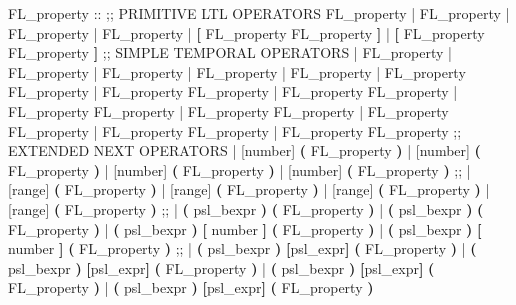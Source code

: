 \begin{Grammar}
FL_property ::
 ;; PRIMITIVE LTL OPERATORS
    FL_property                      
 |  FL_property                     
 |  FL_property                      
 |  FL_property                      
 | \textbf{[} FL_property  FL_property \textbf{]}  
 | \textbf{[} FL_property  FL_property \textbf{]}  
 ;; SIMPLE TEMPORAL OPERATORS
 |  FL_property                 
 |  FL_property                  
 |  FL_property                   
 |  FL_property                  
 |  FL_property            
 | FL_property  FL_property     
 | FL_property  FL_property      
 | FL_property  FL_property                                     
 | FL_property  FL_property     
 | FL_property  FL_property    
 | FL_property  FL_property     
 | FL_property  FL_property   
 | FL_property  FL_property    
 ;; EXTENDED NEXT OPERATORS
 |  [number] \textbf{(} FL_property \textbf{)}
 |  [number] \textbf{(} FL_property \textbf{)}                     
 |  [number] \textbf{(} FL_property \textbf{)}                   
 |  [number] \textbf{(} FL_property \textbf{)}                  
 ;;
 |  [range] \textbf{(} FL_property \textbf{)}
 |  [range] \textbf{(} FL_property \textbf{)}
 |  [range] \textbf{(} FL_property \textbf{)}
 |  [range] \textbf{(} FL_property \textbf{)}
 ;;
 |  \textbf{(} psl_bexpr \textbf{)} \textbf{(} FL_property \textbf{)}
 |  \textbf{(} psl_bexpr \textbf{)} \textbf{(} FL_property \textbf{)}
 |  \textbf{(} psl_bexpr \textbf{)} \textbf{[} number \textbf{]}  \textbf{(} FL_property \textbf{)}
 |  \textbf{(} psl_bexpr \textbf{)} \textbf{[} number \textbf{]}  \textbf{(} FL_property \textbf{)}
 ;;
 |  \textbf{(} psl_bexpr \textbf{)} \textbf{[}psl_expr\textbf{]}  \textbf{(} FL_property \textbf{)}
 |  \textbf{(} psl_bexpr \textbf{)} \textbf{[}psl_expr\textbf{]}  \textbf{(} FL_property \textbf{)}
 |  \textbf{(} psl_bexpr \textbf{)} \textbf{[}psl_expr\textbf{]}  \textbf{(} FL_property \textbf{)}
 |  \textbf{(} psl_bexpr \textbf{)} \textbf{[}psl_expr\textbf{]}  \textbf{(} FL_property \textbf{)}

\end{Grammar}
